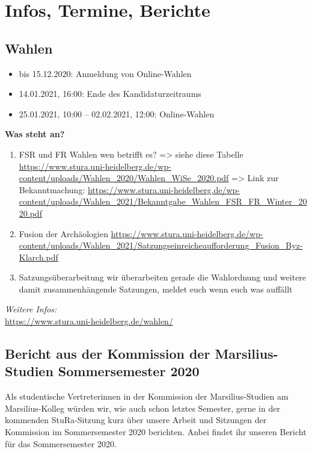 \section{Infos, Termine, Berichte}

\subsection{Wahlen}
\begin{itemize}
    \item bis 15.12.2020: Anmeldung von Online-Wahlen
    \item 14.01.2021, 16:00: Ende des Kandidaturzeitraums
    \item 25.01.2021, 10:00 – 02.02.2021, 12:00: Online-Wahlen
\end{itemize}
\textbf{Was steht an?}
\begin{enumerate}
    \item FSR und FR Wahlen wen betrifft es? => siehe diese Tabelle
    \url{https://www.stura.uni-heidelberg.de/wp-content/uploads/Wahlen_2020/Wahlen_WiSe_2020.pdf}
    => Link zur Bekanntmachung:
    \url{https://www.stura.uni-heidelberg.de/wp-content/uploads/Wahlen_2021/Bekanntgabe_Wahlen_FSR_FR_Winter_2020.pdf}
    \item Fusion der Archäologien \url{https://www.stura.uni-heidelberg.de/wp-content/uploads/Wahlen_2021/Satzungseinreicheaufforderung_Fusion_Byz-Klarch.pdf}
    \item  Satzungsüberarbeitung wir überarbeiten gerade die Wahlordnung und weitere damit zusammenhängende Satzungen, meldet euch wenn euch was auffällt
\end{enumerate}
\emph{Weitere Infos:}\\
\url{https://www.stura.uni-heidelberg.de/wahlen/}

\subsection{Bericht aus der Kommission der Marsilius-Studien Sommersemester 2020}
Als studentische Vertreterinnen in der Kommission der Marsilius-Studien am Marsilius-Kolleg würden wir, wie auch schon letztes Semester, gerne in der kommenden StuRa-Sitzung kurz über unsere Arbeit und Sitzungen der Kommission im Sommersemester 2020 berichten. Anbei findet ihr unseren Bericht für das Sommersemester 2020.
